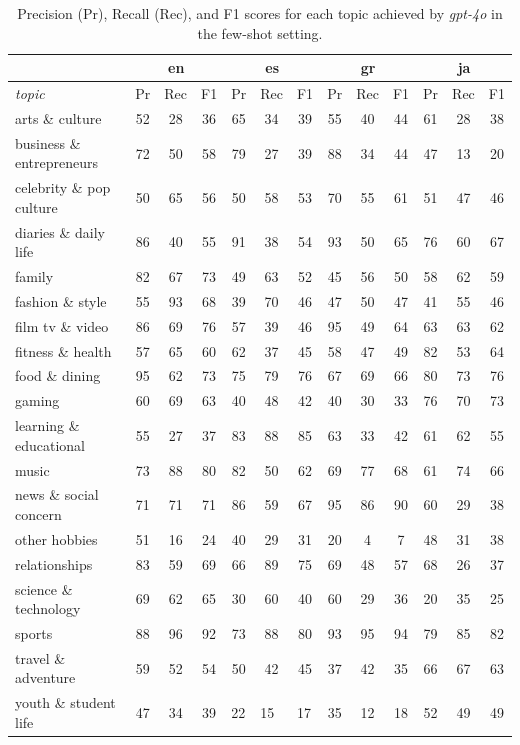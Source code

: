 \begin{table}[]
\begin{tabular}{l|ccc|ccc|ccc|ccc}
 & \multicolumn{3}{c|}{en} & \multicolumn{3}{c|}{es} & \multicolumn{3}{c|}{gr} & \multicolumn{3}{c}{ja} \\ \hline
\textit{topic} & Pr & Rec & F1 & Pr & Rec & F1 & Pr & Rec & F1 & Pr & Rec & F1 \\ \hline
arts \& culture & 52 & 28 & 36 & 65 & 34 & 39 & 55 & 40 & 44 & 61 & 28 & 38 \\
business \& entrepreneurs & 72 & 50 & 58 & 79 & 27 & 39 & 88 & 34 & 44 & 47 & 13 & 20 \\
celebrity \& pop culture & 50 & 65 & 56 & 50 & 58 & 53 & 70 & 55 & 61 & 51 & 47 & 46 \\
diaries \& daily life & 86 & 40 & 55 & 91 & 38 & 54 & 93 & 50 & 65 & 76 & 60 & 67 \\
family & 82 & 67 & 73 & 49 & 63 & 52 & 45 & 56 & 50 & 58 & 62 & 59 \\
fashion \& style & 55 & 93 & 68 & 39 & 70 & 46 & 47 & 50 & 47 & 41 & 55 & 46 \\
film tv \& video & 86 & 69 & 76 & 57 & 39 & 46 & 95 & 49 & 64 & 63 & 63 & 62 \\
fitness \& health & 57 & 65 & 60 & 62 & 37 & 45 & 58 & 47 & 49 & 82 & 53 & 64 \\
food \& dining & 95 & 62 & 73 & 75 & 79 & 76 & 67 & 69 & 66 & 80 & 73 & 76 \\
gaming & 60 & 69 & 63 & 40 & 48 & 42 & 40 & 30 & 33 & 76 & 70 & 73 \\
learning \& educational & 55 & 27 & 37 & 83 & 88 & 85 & 63 & 33 & 42 & 61 & 62 & 55 \\
music & 73 & 88 & 80 & 82 & 50 & 62 & 69 & 77 & 68 & 61 & 74 & 66 \\
news \& social concern & 71 & 71 & 71 & 86 & 59 & 67 & 95 & 86 & 90 & 60 & 29 & 38 \\
other hobbies & 51 & 16 & 24 & 40 & 29 & 31 & 20 & 4 & 7 & 48 & 31 & 38 \\
relationships & 83 & 59 & 69 & 66 & 89 & 75 & 69 & 48 & 57 & 68 & 26 & 37 \\
science \& technology & 69 & 62 & 65 & 30 & 60 & 40 & 60 & 29 & 36 & 20 & 35 & 25 \\
sports & 88 & 96 & 92 & 73 & 88 & 80 & 93 & 95 & 94 & 79 & 85 & 82 \\
travel \& adventure & 59 & 52 & 54 & 50 & 42 & 45 & 37 & 42 & 35 & 66 & 67 & 63 \\
youth \& student life & 47 & 34 & 39 & \multicolumn{1}{l}{22} & \multicolumn{1}{l}{15} & \multicolumn{1}{l|}{17} & 35 & 12 & 18 & 52 & 49 & 49
\end{tabular}
\caption{Precision (Pr), Recall (Rec), and F1 scores for each topic achieved by  \textit{gpt-4o} in the few-shot setting.}
\label{tab:gpt-4o-details}
\end{table}


